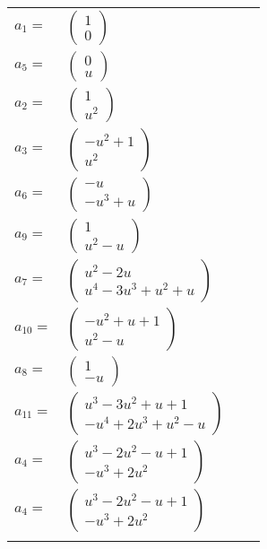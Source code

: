 \documentclass[1p]{elsarticle_modified}
\theoremstyle{definition}
\begin{document}
\begin{tabular}{m{7pt} m{180pt} m{7pt} m{180pt} }
\flushright $a_{1}=$&$\begin{pmatrix}1\\0\end{pmatrix}$ \\
\flushright $a_{5}=$&$\begin{pmatrix}0\\u\end{pmatrix}$ \\
\flushright $a_{2}=$&$\begin{pmatrix}1\\u^2\end{pmatrix}$ \\
\flushright $a_{3}=$&$\begin{pmatrix}- u^2+1\\u^2\end{pmatrix}$ \\
\flushright $a_{6}=$&$\begin{pmatrix}- u\\- u^3+u\end{pmatrix}$ \\
\flushright $a_{9}=$&$\begin{pmatrix}1\\u^2- u\end{pmatrix}$ \\
\flushright $a_{7}=$&$\begin{pmatrix}u^2-2 u\\u^4-3 u^3+u^2+u\end{pmatrix}$ \\
\flushright $a_{10}=$&$\begin{pmatrix}- u^2+u+1\\u^2- u\end{pmatrix}$ \\
\flushright $a_{8}=$&$\begin{pmatrix}1\\- u\end{pmatrix}$ \\
\flushright $a_{11}=$&$\begin{pmatrix}u^3-3 u^2+u+1\\- u^4+2 u^3+u^2- u\end{pmatrix}$ \\
\flushright $a_{4}=$&$\begin{pmatrix}u^3-2 u^2- u+1\\- u^3+2 u^2\end{pmatrix}$\\ \flushright $a_{4}=$&$\begin{pmatrix}u^3-2 u^2- u+1\\- u^3+2 u^2\end{pmatrix}$\\&\end{tabular}
\end{document}

